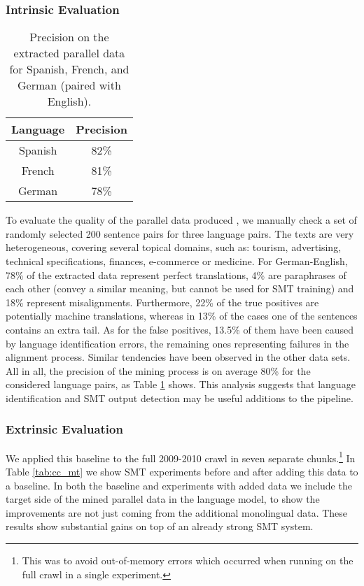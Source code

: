 \subsubsection{Intrinsic Evaluation}

\begin{table}[ht]
\begin{center}
\begin{tabular}{|c|c|}
\hline
Language & Precision \\
\hline
Spanish & 82\% \\
\hline
French & 81\% \\ 
\hline
German & 78\% \\
\hline
\end{tabular}
\end{center}
\caption{Precision on the extracted parallel data for Spanish, French, and
German (paired with English).}
\label{tab:intrinsic}
\end{table}

To evaluate the quality of the parallel data produced , we manually check a set of randomly selected 200 sentence
pairs for three language pairs. The
texts are very heterogeneous, covering several topical domains, such as:
tourism, advertising, technical specifications, finances, e-commerce or
medicine. 
For German-English, 78\% of the extracted data represent perfect translations, 4\% are
paraphrases of each other (convey a similar meaning, but cannot be used for SMT
training) and 18\% represent misalignments. Furthermore, 22\% of the true
positives are potentially machine translations, whereas in 13\% of the cases one
of the sentences contains an extra tail. As for the false positives, 13.5\% of
them have been caused by language identification errors, the remaining ones
representing failures in the alignment process. Similar tendencies have been
observed in the other data sets.
All in all, the precision of the mining process is on average 80\% for the
considered language pairs, as Table \ref{tab:intrinsic} shows.
This analysis suggests that language identification and SMT output
detection \citep{Venugopal11} may be useful additions to the pipeline.

\subsubsection{Extrinsic Evaluation}
We applied this baseline to the full 2009-2010 crawl in seven separate
chunks.\footnote{This was to avoid out-of-memory errors which occurred when
running on the full crawl in a single experiment.}
In Table \ref{tab:cc_mt} we show SMT
experiments before and after adding this data to a baseline.
In both the baseline and experiments with added data we include the target side of the mined
parallel data in the language model, to show the improvements are not just
coming from the additional monolingual data.
These results show substantial gains on top of an already strong SMT system.

